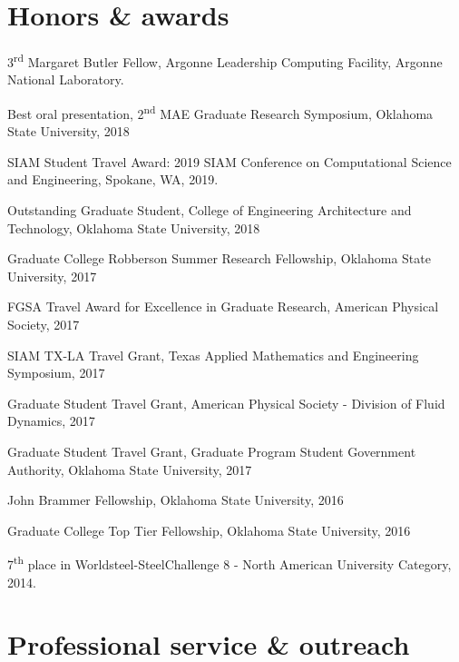 \documentclass[letterpaper]{article}
\renewenvironment{itemize}{
  \begin{list}{}{
    \setlength{\leftmargin}{1.5em}
  }
}{
  \end{list}
}
\begin{document}
\section*{Honors \& awards}

\begin{itemize}

\item 3\textsuperscript{rd} Margaret Butler Fellow, Argonne Leadership Computing Facility, Argonne National Laboratory.

\item Best oral presentation, 2\textsuperscript{nd} MAE Graduate Research Symposium, Oklahoma State University, 2018

\item SIAM Student Travel Award: 2019 SIAM Conference on Computational Science and Engineering, Spokane, WA, 2019.

\item Outstanding Graduate Student, College of Engineering Architecture and Technology, Oklahoma State University, 2018

\item Graduate College Robberson Summer Research Fellowship, Oklahoma State University, 2017

\item FGSA Travel Award for Excellence in Graduate Research, American Physical Society, 2017

\item SIAM TX-LA Travel Grant, Texas Applied Mathematics and Engineering Symposium, 2017

\item Graduate Student Travel Grant, American Physical Society - Division of Fluid Dynamics, 2017

\item Graduate Student Travel Grant, Graduate Program Student Government Authority, Oklahoma State University, 2017

\item John Brammer Fellowship, Oklahoma State University, 2016

\item Graduate College Top Tier Fellowship, Oklahoma State University, 2016

\item 7\textsuperscript{th} place in Worldsteel-SteelChallenge 8 - North American University Category, 2014.
\end{itemize}

\section*{Professional service \& outreach}
\end{document}
